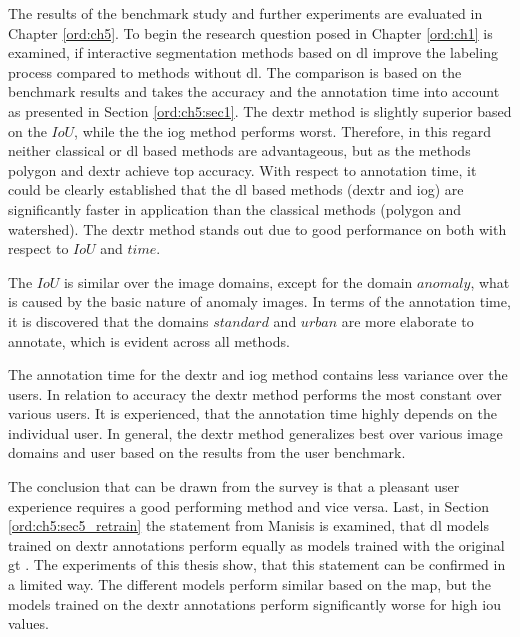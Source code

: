 The results of the benchmark study and further experiments are evaluated in Chapter \ref{ord:ch5}.
To begin the research question posed in Chapter \ref{ord:ch1} is examined, if interactive segmentation methods based on \gls{dl} improve the labeling process compared to methods without \gls{dl}.
The comparison is based on the benchmark results and takes the accuracy and the annotation time into account as presented in Section \ref{ord:ch5:sec1}.
The \gls{dextr} method is slightly superior based on the $ IoU $, while the the \gls{iog} method performs worst.
Therefore, in this regard neither classical or \gls{dl} based methods are advantageous, but as the methods polygon and \gls{dextr} achieve top accuracy.
With respect to annotation time, it could be clearly established that the \gls{dl} based methods (\gls{dextr} and \gls{iog}) are significantly faster in application than the classical methods (polygon and watershed).
The \gls{dextr} method stands out due to good performance on both with respect to $ IoU $ and $ time $.

The $ IoU $ is similar over the image domains, except for the domain $ anomaly $, what is caused by the basic nature of anomaly images.
In terms of the annotation time, it is discovered that the domains $ standard $ and $ urban $ are more elaborate to annotate, which is evident across all methods.

The annotation time for the \gls{dextr} and \gls{iog} method contains less variance over the users.
In relation to accuracy the \gls{dextr} method performs the most constant over various users.
It is experienced, that the annotation time highly depends on the individual user.
In general, the \gls{dextr} method generalizes best over various image domains and user based on the results from the user benchmark.

The conclusion that can be drawn from the survey is that a pleasant user experience requires a good performing method and vice versa.
Last, in Section \ref{ord:ch5:sec5_retrain} the statement from Manisis \etal is examined, that \gls{dl} models trained on \gls{dextr} annotations perform equally as models trained with the original \gls{gt} \cite{Man18-DEXTR}.
The experiments of this thesis show, that this statement can be confirmed in a limited way.
The different models perform similar based on the \gls{map}, but the models trained on the \gls{dextr} annotations perform significantly worse for high \gls{iou} values. 

